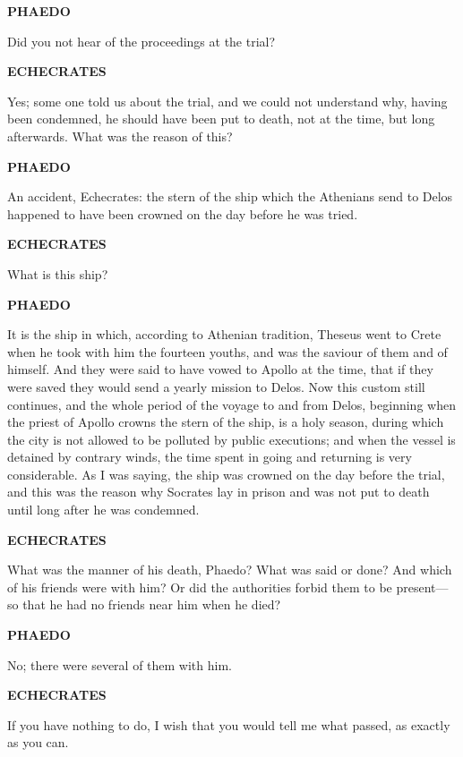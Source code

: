 \documentclass[11pt,letter]{article}
\begin{document}
\par \textbf{PHAEDO}
\par   Did you not hear of the proceedings at the trial?

\par \textbf{ECHECRATES}
\par   Yes; some one told us about the trial, and we could not understand why, having been condemned, he should have been put to death, not at the time, but long afterwards. What was the reason of this?

\par \textbf{PHAEDO}
\par   An accident, Echecrates:  the stern of the ship which the Athenians send to Delos happened to have been crowned on the day before he was tried.

\par \textbf{ECHECRATES}
\par   What is this ship?

\par \textbf{PHAEDO}
\par   It is the ship in which, according to Athenian tradition, Theseus went to Crete when he took with him the fourteen youths, and was the saviour of them and of himself. And they were said to have vowed to Apollo at the time, that if they were saved they would send a yearly mission to Delos. Now this custom still continues, and the whole period of the voyage to and from Delos, beginning when the priest of Apollo crowns the stern of the ship, is a holy season, during which the city is not allowed to be polluted by public executions; and when the vessel is detained by contrary winds, the time spent in going and returning is very considerable. As I was saying, the ship was crowned on the day before the trial, and this was the reason why Socrates lay in prison and was not put to death until long after he was condemned.

\par \textbf{ECHECRATES}
\par   What was the manner of his death, Phaedo? What was said or done? And which of his friends were with him? Or did the authorities forbid them to be present—so that he had no friends near him when he died?

\par \textbf{PHAEDO}
\par   No; there were several of them with him.

\par \textbf{ECHECRATES}
\par   If you have nothing to do, I wish that you would tell me what passed, as exactly as you can.
\end{document}
